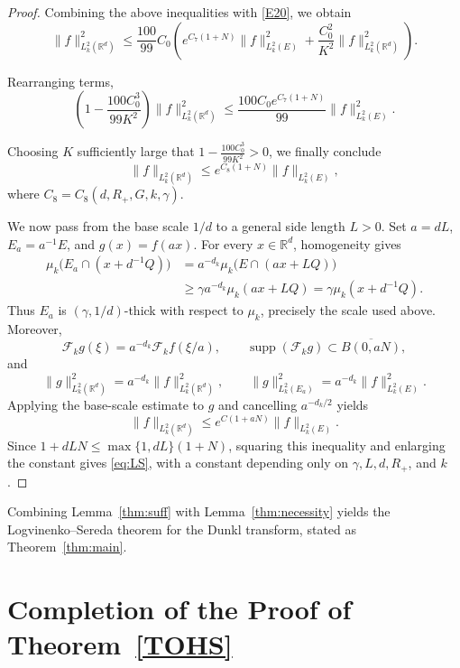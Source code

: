 \documentclass[12pt]{article}
\DeclareMathOperator{\supp}{supp}
\begin{document}
\begin{proof}
Combining the above inequalities with \eqref{E20}, we obtain
\[
\|f\|^2_{L_k^2(\mathbb{R}^d)}
\le \frac{100}{99} C_0 \left(
 e^{C_7(1+N)} \|f\|^2_{L_k^2(E)}
+ \frac{C_0^2}{K^2} \|f\|^2_{L_k^2(\mathbb{R}^d)}
\right).
\]

Rearranging terms,
\[
\left(1-\frac{100 C_0^3}{99 K^2}\right) \|f\|^2_{L_k^2(\mathbb{R}^d)}
\le \frac{100 C_0 e^{C_7(1+N)}}{99} \|f\|^2_{L_k^2(E)}.
\]

 
Choosing $K$ sufficiently large that $1-\frac{100 C_0^3}{99 K^2} > 0$, we finally conclude
\[
\|f\|_{L_k^2(\mathbb{R}^d)} \le e^{C_8(1+N)} \|f\|_{L_k^2(E)},
\]
where $C_8 = C_8(d, R_+, G, k, \gamma)$.


We now pass from the base scale $1/d$ to a general side length $L>0$. Set $a=dL$, $E_a=a^{-1}E$, and $g(x)=f(ax)$. For every $x\in\mathbb{R}^d$, homogeneity gives
\[
\begin{aligned}
\mu_k\bigl(E_a\cap(x+d^{-1}Q)\bigr)
&=a^{-d_k}\mu_k\bigl(E\cap(ax+LQ)\bigr)\\
&\ge\gamma a^{-d_k}\mu_k(ax+LQ)
=\gamma\mu_k(x+d^{-1}Q).
\end{aligned}
\]
Thus $E_a$ is $(\gamma,1/d)$-thick with respect to $\mu_k$, precisely the scale used above. Moreover,
\[
\mathcal{F}_k g(\xi)=a^{-d_k}\mathcal{F}_k f(\xi/a),\qquad
\supp(\mathcal{F}_k g)\subset\overline{B(0,aN)},
\]
and
\[
\|g\|_{L_k^2(\mathbb{R}^d)}^2=a^{-d_k}\|f\|_{L_k^2(\mathbb{R}^d)}^2,\qquad
\|g\|_{L_k^2(E_a)}^2=a^{-d_k}\|f\|_{L_k^2(E)}^2.
\]
Applying the base-scale estimate to $g$ and cancelling $a^{-d_k/2}$ yields
\[
\|f\|_{L_k^2(\mathbb{R}^d)}\le e^{C(1+aN)}\|f\|_{L_k^2(E)}.
\]
Since $1+dLN\le\max\{1,dL\}(1+N)$, squaring this inequality and enlarging the constant gives \eqref{eq:LS}, with a constant depending only on $\gamma,L,d,R_+$, and $k$.
\end{proof}
 Combining Lemma~\ref{thm:suff} with Lemma~\ref{thm:necessity} yields the Logvinenko--Sereda theorem for the Dunkl transform, stated as Theorem~\ref{thm:main}.


\section{Completion of the Proof of Theorem~\ref{TOHS}}
\end{document}
